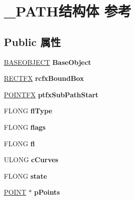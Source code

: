 \hypertarget{struct___p_a_t_h}{}\section{\+\_\+\+P\+A\+T\+H结构体 参考}
\label{struct___p_a_t_h}
\subsection*{Public 属性}
\begin{DoxyCompactItemize}
\item 
\mbox{\label{struct___p_a_t_h_a6318e20477e9ed391d782fb5ae8f2c7c}} 
\hyperlink{class_b_a_s_e_o_b_j_e_c_t}{B\+A\+S\+E\+O\+B\+J\+E\+CT} {\bfseries Base\+Object}
\item 
\mbox{\label{struct___p_a_t_h_a11506abff8b899afe0800e7abd521fea}} 
\hyperlink{struct___r_e_c_t_f_x}{R\+E\+C\+T\+FX} {\bfseries rcfx\+Bound\+Box}
\item 
\mbox{\label{struct___p_a_t_h_a58c2ab1e89d8859c125bf029f5bede22}} 
\hyperlink{structtag_p_o_i_n_t_f_x}{P\+O\+I\+N\+T\+FX} {\bfseries ptfx\+Sub\+Path\+Start}
\item 
\mbox{\label{struct___p_a_t_h_a41f8c513d77f55a38e03ec1203af270b}} 
F\+L\+O\+NG {\bfseries fl\+Type}
\item 
\mbox{\label{struct___p_a_t_h_ae44a315e67d475175053c2ceb87a22ce}} 
F\+L\+O\+NG {\bfseries flags}
\item 
\mbox{\label{struct___p_a_t_h_a79e6011820ab9aae3e0bd8f1aa8655e5}} 
F\+L\+O\+NG {\bfseries fl}
\item 
\mbox{\label{struct___p_a_t_h_abfe207bc01bd48fc243f2889ec332094}} 
U\+L\+O\+NG {\bfseries c\+Curves}
\item 
\mbox{\label{struct___p_a_t_h_a68a13a636fab5b363122b53e9eedb259}} 
F\+L\+O\+NG {\bfseries state}
\item 
\mbox{\label{struct___p_a_t_h_aa1160979260728885136223f713743e8}} 
\hyperlink{structtag_p_o_i_n_t}{P\+O\+I\+NT} $\ast$ {\bfseries p\+Points}

\end{DoxyCompactItemize}
